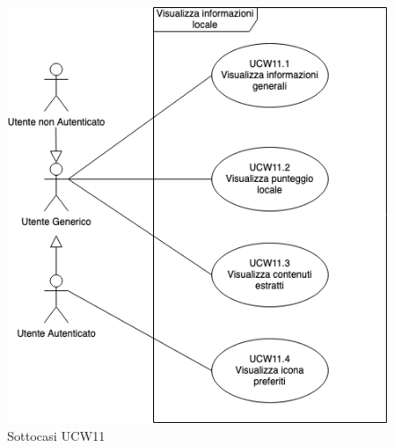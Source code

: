 \begin{figure}[H]
	\centering
		\includegraphics[scale=0.5]{UC_images/UCW11-.png} 
		\caption{Sottocasi UCW11}
	\end{figure}  


